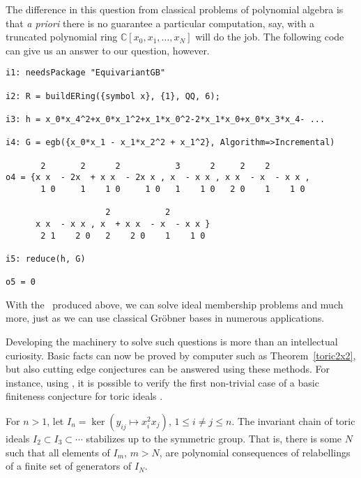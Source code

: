 The difference in this question from classical problems of polynomial algebra is that \textit{a priori} there is no guarantee a particular computation, say, with a truncated polynomial ring $\mathbb C[x_0,x_1,\ldots, x_N]$ will do the job.  The following code can give us an answer to our question, however.
\begin{M2}
\begin{verbatim}
i1: needsPackage "EquivariantGB"

i2: R = buildERing({symbol x}, {1}, QQ, 6);

i3: h = x_0*x_4^2+x_0*x_1^2+x_1*x_0^2-2*x_1*x_0+x_0*x_3*x_4- ...

i4: G = egb({x_0*x_1 - x_1*x_2^2 + x_1^2}, Algorithm=>Incremental)

       2       2      2           3      2     2    2         
o4 = {x x  - 2x  + x x  - 2x x , x  - x x , x x  - x  - x x , 
       1 0     1    1 0     1 0   1    1 0   2 0    1    1 0 

                    2           2 
      x x  - x x , x  + x x  - x  - x x }
       2 1    2 0   2    2 0    1    1 0

i5: reduce(h, G)

o5 = 0
\end{verbatim}
\end{M2}  
With the \EGB\ produced above, we can solve ideal membership problems and much more, just as we can use classical Gr\"obner bases in numerous applications.  %

Developing the machinery to solve such questions is more than an intellectual curiosity.  Basic facts can now be proved by computer such as Theorem~\ref{toric2x2}, but also cutting edge conjectures can be answered using these methods.  For instance, using \cite{EquivariantGB}, it is possible to verify \cite{draisma2013noetherianity, Krone:egb-toric} the first non-trivial case of a basic finiteness conjecture for toric ideals \cite{aschenbrenner2007finite}.  

\begin{theorem}\label{monomthm}
For $n > 1$, let $I_n = \ker (y_{ij} \mapsto x_i^2 x_j)$, $1 \leq i \neq j \leq n$.  The invariant chain of toric ideals $I_2 \subset I_3 \subset \cdots$ stabilizes up to the symmetric group.  That is, there is some $N$ such that all elements of $I_m$, $m > N$, are polynomial consequences of relabellings of a finite set of generators of $I_N$.
\end{theorem}

